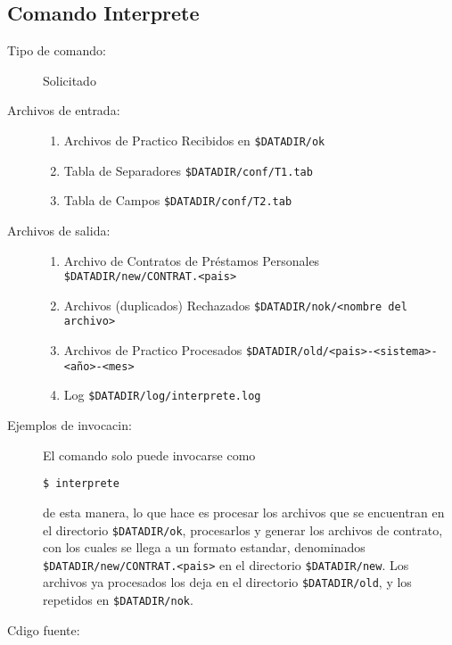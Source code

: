 \documentclass[12pt]{article}
\begin{document}
\subsection{Comando Interprete}
\begin{description}
	\item [Tipo de comando:] Solicitado
	
	\item [Archivos de entrada:]
	\begin{enumerate}
		\item Archivos de Practico Recibidos en \verb|$DATADIR/ok|
		\item Tabla de Separadores \verb|$DATADIR/conf/T1.tab|
		\item Tabla de Campos \verb|$DATADIR/conf/T2.tab|
	\end{enumerate}
	
	\item [Archivos de salida:]
	\begin{enumerate}
		\item Archivo de Contratos de Préstamos Personales \verb|$DATADIR/new/CONTRAT.<pais>|
		\item Archivos (duplicados) Rechazados \verb|$DATADIR/nok/<nombre del archivo>|
		\item Archivos de Practico Procesados \verb|$DATADIR/old/<pais>-<sistema>-<año>-<mes>|
		\item Log \verb|$DATADIR/log/interprete.log|
	\end{enumerate}
	
	\item [Ejemplos de invocacin:]	El comando solo puede invocarse como
	\begin{verbatim}$ interprete\end{verbatim}
	de esta manera, lo que hace es procesar los archivos que se encuentran en el directorio \verb|$DATADIR/ok|, procesarlos y generar los archivos de contrato, con los cuales se llega a un formato estandar, denominados \verb|$DATADIR/new/CONTRAT.<pais>| en el directorio \verb|$DATADIR/new|. Los archivos ya procesados los deja en el directorio \verb|$DATADIR/old|, y los repetidos en \verb|$DATADIR/nok|.
	
	\item [Cdigo fuente:]
\end{description}
{\footnotesize

}
\end{document}
